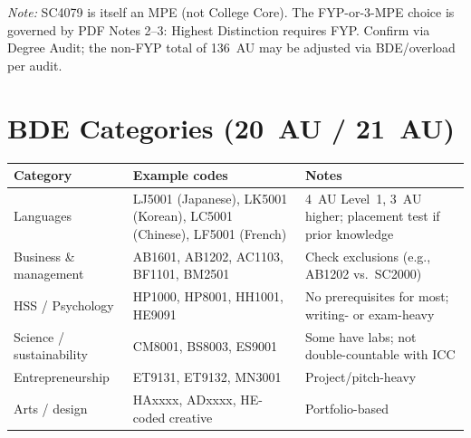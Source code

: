 \noindent\textit{Note:} SC4079 is itself an MPE (not College Core). The FYP-or-3-MPE choice is governed by PDF Notes 2--3: Highest Distinction requires FYP. Confirm via Degree Audit; the non-FYP total of 136~AU may be adjusted via BDE/overload per audit.

\section{BDE Categories (20~AU / 21~AU)}
\label{sec:au-bde-detail}

\begin{table}[h]
\centering
\footnotesize
\renewcommand{\arraystretch}{1.22}
\setlength{\tabcolsep}{3pt}\footnotesize\begin{tabular}{@{}p{2.7cm} p{3.4cm} p{5.1cm}@{}}
\toprule
Category & Example codes & Notes \\
\midrule
Languages & LJ5001 (Japanese), LK5001 (Korean), LC5001 (Chinese), LF5001 (French) & 4~AU Level~1, 3~AU higher; placement test if prior knowledge \\
Business \& management & AB1601, AB1202, AC1103, BF1101, BM2501 & Check exclusions (e.g., AB1202 vs.\ SC2000) \\
HSS / Psychology & HP1000, HP8001, HH1001, HE9091 & No prerequisites for most; writing- or exam-heavy \\
Science / sustainability & CM8001, BS8003, ES9001 & Some have labs; not double-countable with ICC \\
Entrepreneurship & ET9131, ET9132, MN3001 & Project/pitch-heavy \\
Arts / design & HAxxxx, ADxxxx, HE-coded creative & Portfolio-based \\
\bottomrule
\end{tabular}
\end{table}

\begin{center}
\end{center}

